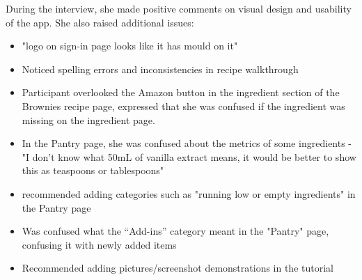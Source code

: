 \documentclass[manuscript, screen, nonacm]{acmart}
\begin{document}
During the interview, she made positive comments on visual design and usability of the app. She also raised additional issues:
\begin{itemize}
    \item "logo on sign-in page looks like it has mould on it"
    \item Noticed spelling errors and inconsistencies in recipe walkthrough
    \item Participant overlooked the Amazon button in the ingredient section of the Brownies recipe page, expressed that she was confused if the ingredient was missing on the ingredient page.
    \item In the Pantry page, she was confused about the metrics of some ingredients - "I don't know what 50mL of vanilla extract means, it would be better to show this as teaspoons or tablespoons"
    \item recommended adding categories such as "running low or empty ingredients" in the Pantry page
    \item Was confused what the “Add-ins” category meant in the "Pantry" page, confusing it with newly added items 
    \item Recommended adding pictures/screenshot demonstrations in the tutorial
\end{itemize} 
\end{document}
